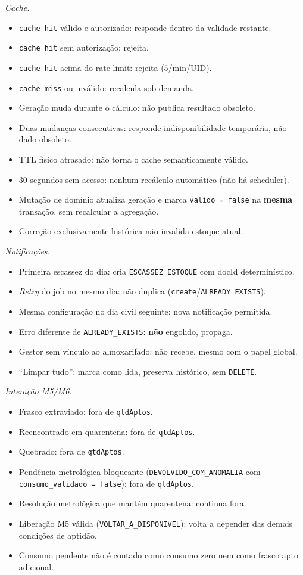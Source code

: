 \emph{Cache.}
\begin{itemize}
    \item \texttt{cache hit} válido e autorizado: responde dentro da validade restante.
    \item \texttt{cache hit} sem autorização: rejeita.
    \item \texttt{cache hit} acima do rate limit: rejeita ($5$/min/UID).
    \item \texttt{cache miss} ou inválido: recalcula sob demanda.
    \item Geração muda durante o cálculo: não publica resultado obsoleto.
    \item Duas mudanças consecutivas: responde indisponibilidade temporária, não dado obsoleto.
    \item TTL físico atrasado: não torna o cache semanticamente válido.
    \item $30$ segundos sem acesso: nenhum recálculo automático (não há scheduler).
    \item Mutação de domínio atualiza geração e marca \texttt{valido = false} na \textbf{mesma} transação, sem recalcular a agregação.
    \item Correção exclusivamente histórica não invalida estoque atual.
\end{itemize}

\emph{Notificações.}
\begin{itemize}
    \item Primeira escassez do dia: cria \texttt{ESCASSEZ\_ESTOQUE} com docId determinístico.
    \item \textit{Retry} do job no mesmo dia: não duplica (\texttt{create}/\texttt{ALREADY\_EXISTS}).
    \item Mesma configuração no dia civil seguinte: nova notificação permitida.
    \item Erro diferente de \texttt{ALREADY\_EXISTS}: \textbf{não} engolido, propaga.
    \item Gestor sem vínculo ao almoxarifado: não recebe, mesmo com o papel global.
    \item ``Limpar tudo'': marca como lida, preserva histórico, sem \texttt{DELETE}.
\end{itemize}

\emph{Interação M5/M6.}
\begin{itemize}
    \item Frasco extraviado: fora de \texttt{qtdAptos}.
    \item Reencontrado em quarentena: fora de \texttt{qtdAptos}.
    \item Quebrado: fora de \texttt{qtdAptos}.
    \item Pendência metrológica bloqueante (\texttt{DEVOLVIDO\_COM\_ANOMALIA} com \texttt{consumo\_validado = false}): fora de \texttt{qtdAptos}.
    \item Resolução metrológica que mantém quarentena: continua fora.
    \item Liberação M5 válida (\texttt{VOLTAR\_A\_DISPONIVEL}): volta a depender das demais condições de aptidão.
    \item Consumo pendente não é contado como consumo zero nem como frasco apto adicional.
\end{itemize}

